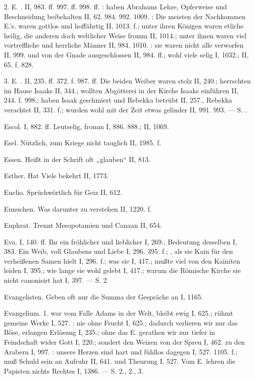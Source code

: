 2. E. . II, 983. ff. 997. ff. 998. ff. : haben Abrahams Lehre, Opferweise und Beschneidung beibehalten II, 62. 984. 992. 1009. : Die meisten der Nachkommen E.’s. waren gottlos und hoffährtig II, 1013. f.; unter ihren Königen waren etliche heilig, die anderen doch weltlicher Weise fromm II, 1014.; unter ihnen waren viel vortreffliche und herrliche Männer II, 984. 1010. : sie waren nicht alle verworfen II, 999. und von der Gnade ausgeschlossen II, 984. ff.; wohl viele selig I, 1032.; II, 65. f. 828.

3. E. . II, 235. ff. 372. f. 987. ff. Die beiden  Weiber waren stolz II, 240.; herrschten im Hause Isaaks II, 344.; wollten Abgötterei in der Kirche Isaaks einführen II, 244. f. 998.; haben Isaak geschmiert und Rebekka betrübt II, 257., Rebekka verachtet II, 331. f.; wurden wohl mit der Zeit etwas gelinder II, 991. 993. — S. .

Escol. I, 882. ff. Leutselig, fromm I, 886. 888.; II, 1069.

Esel. Nützlich, zum Kriege nicht tauglich II, 1985. f.

Essen. Heißt in der Schrift oft „glauben“ II, 813.

Esther. Hat Viele bekehrt II, 1773.

Euclio. Sprüchwörtlich für Geiz II, 612.

Eunuchen. Was darunter zu verstehen II, 1220. f.

Euphrat. Trennt Mesopotamien und Canaan II, 654.

Eva. I, 140. ff. Ihr  ein fröhlicher und lieblicher I, 269.; Bedeutung desselben I, 383. Ein  Weib, voll Glaubens und Liebe I, 296. 395. f.; , als sie Kain für den verheißenen Samen hielt I, 296. f.; was sie  I, 417.; mußte viel von den Kainiten leiden I, 395.; wie lange sie wohl gelebt I, 417.; warum die Römische Kirche sie nicht canonisirt hat I, 397. — S.  2.

Evangelisten. Geben oft nur die Summa der Gespräche an I, 1165.

Evangelium. 1.  war vom Falle Adams in der Welt, bleibt ewig I, 625.; rühmt gemeine Werke I, 527. : nie ohne Frucht I, 625.; dadurch verlieren wir nur das Böse, erlangen Erlösung I, 235.; ohne das E. gerathen wir nur tiefer in Feindschaft wider Gott I, 220.; sondert den Weizen von der Spreu I, 462.  zu den Arabern I, 997. : unsere Herzen sind hart und fühllos dagegen I, 527. 1105. f.; muß Schuld sein an Aufruhr II, 641. und Theurung I, 527. Vom E. lehren die Papisten nichts Rechtes I, 1386. — S.  2.,  2.,  3.

